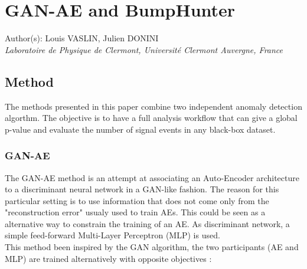 \documentclass[letterpaper,11pt]{article}
\begin{document}
\section*{GAN-AE and BumpHunter}
Author(s): Louis VASLIN, Julien DONINI \\ \textit{Laboratoire de Physique de Clermont, Université Clermont Auvergne, France}\\


\subsection{Method}
\label{sec:method}

\noindent The methods presented in this paper combine two independent anomaly detection algorthm.
The objective is to have a full analysis workflow that can give a global p-value and evaluate the number of signal events in any black-box dataset.

\subsubsection{GAN-AE}
\label{sec:GAN-AE}

\noindent The GAN-AE method is an attempt at associating an Auto-Encoder architecture to a discriminant neural network in a GAN-like fashion.
The reason for this particular setting is to use information that does not come only from the "reconstruction error" usualy used to train AEs.
This could be seen as a alternative way to constrain the training of an AE.
As discriminant network, a simple feed-forward Multi-Layer Perceptron (MLP) is used. \\

\noindent This method been inspired by the GAN algorithm, the two participants (AE and MLP) are trained alternatively with opposite objectives :
\end{document}
